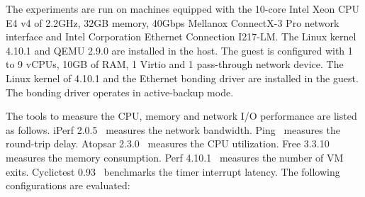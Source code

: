 
The experiments are run on machines equipped with the 10-core
Intel Xeon CPU E4 v4 of 2.2GHz, 32GB memory, 40Gbps Mellanox
ConnectX-3 Pro network interface and Intel Corporation
Ethernet Connection I217-LM. The Linux kernel 4.10.1 and QEMU
2.9.0 are installed in the host. The guest is configured with
1 to 9 vCPUs, 10GB of RAM, 1 Virtio and 1 pass-through network
device. The Linux kernel of 4.10.1 and the Ethernet bonding
driver are installed in the guest. The bonding driver operates
in active-backup mode.

The tools to measure the CPU, memory and network I/O
performance are listed as follows. iPerf 2.0.5~\cite{iperf}
measures the network bandwidth. Ping~\cite{ping} measures the
round-trip delay. Atopsar 2.3.0~\cite{atopsar} measures the
CPU utilization. Free 3.3.10~\cite{free} measures the memory
consumption. Perf 4.10.1~\cite{perf} measures the number of VM
exits. Cyclictest 0.93~\cite{cyclictest} benchmarks the timer
interrupt latency.
The following configurations are evaluated:

